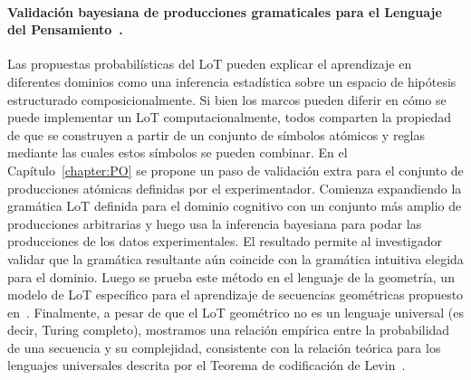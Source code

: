 \paragraph{Validación bayesiana de producciones gramaticales para el Lenguaje del Pensamiento~\cite{romano2018bayesian}.} 
Las propuestas probabilísticas del LoT pueden explicar el aprendizaje en diferentes dominios como una inferencia estadística sobre un espacio de hipótesis estructurado composicionalmente. Si bien los marcos pueden diferir en cómo se puede implementar un LoT computacionalmente, todos comparten la propiedad de que se construyen a partir de un conjunto de símbolos atómicos y reglas mediante las cuales estos símbolos se pueden combinar. En el Capítulo~\ref{chapter:PO} se propone un paso de validación extra para el conjunto de producciones atómicas definidas por el experimentador. Comienza expandiendo la gramática LoT definida para el dominio cognitivo con un conjunto más amplio de producciones arbitrarias y luego usa la inferencia bayesiana para podar las producciones de los datos experimentales. El resultado permite al investigador validar que la gramática resultante aún coincide con la gramática intuitiva elegida para el dominio. Luego se prueba este método en el lenguaje de la geometría, un modelo de LoT específico para el aprendizaje de secuencias geométricas propuesto en~\cite{amalric2017language}. Finalmente, a pesar de que el LoT geométrico no es un lenguaje universal (es decir, Turing completo), mostramos una relación empírica entre la probabilidad de una secuencia y su complejidad, consistente con la relación teórica para los lenguajes universales descrita por el Teorema de codificación de Levin~\cite{levin1974laws}.


